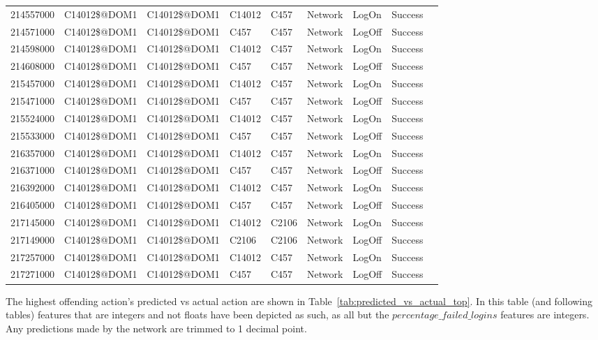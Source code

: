 \begin{table}[htbp]
{\begin{tabular}{lllllllll}
			214557000 & C14012\$@DOM1 & C14012\$@DOM1 & C14012 & C457 & Network & LogOn & Success \\
			214571000 & C14012\$@DOM1 & C14012\$@DOM1 & C457 & C457 & Network & LogOff & Success \\
			214598000 & C14012\$@DOM1 & C14012\$@DOM1 & C14012 & C457 & Network & LogOn & Success \\
			214608000 & C14012\$@DOM1 & C14012\$@DOM1 & C457 & C457 & Network & LogOff & Success \\
			215457000 & C14012\$@DOM1 & C14012\$@DOM1 & C14012 & C457 & Network & LogOn & Success \\
			215471000 & C14012\$@DOM1 & C14012\$@DOM1 & C457 & C457 & Network & LogOff & Success \\
			215524000 & C14012\$@DOM1 & C14012\$@DOM1 & C14012 & C457 & Network & LogOn & Success \\
			215533000 & C14012\$@DOM1 & C14012\$@DOM1 & C457 & C457 & Network & LogOff & Success \\
			216357000 & C14012\$@DOM1 & C14012\$@DOM1 & C14012 & C457 & Network & LogOn & Success \\
			216371000 & C14012\$@DOM1 & C14012\$@DOM1 & C457 & C457 & Network & LogOff & Success \\
			216392000 & C14012\$@DOM1 & C14012\$@DOM1 & C14012 & C457 & Network & LogOn & Success \\
			216405000 & C14012\$@DOM1 & C14012\$@DOM1 & C457 & C457 & Network & LogOff & Success \\
			217145000 & C14012\$@DOM1 & C14012\$@DOM1 & C14012 & C2106 & Network & LogOn & Success \\
			217149000 & C14012\$@DOM1 & C14012\$@DOM1 & C2106 & C2106 & Network & LogOff & Success \\
			217257000 & C14012\$@DOM1 & C14012\$@DOM1 & C14012 & C457 & Network & LogOn & Success \\
			217271000 & C14012\$@DOM1 & C14012\$@DOM1 & C457 & C457 & Network & LogOff & Success
		\end{tabular}
	}
\end{table}

The highest offending action's predicted vs actual action are shown in Table~\ref{tab:predicted_vs_actual_top}. In this table (and following tables) features that are integers and not floats have been depicted as such, as all but the \(percentage\_failed\_logins\) features are integers. Any predictions made by the network are trimmed to 1 decimal point.

